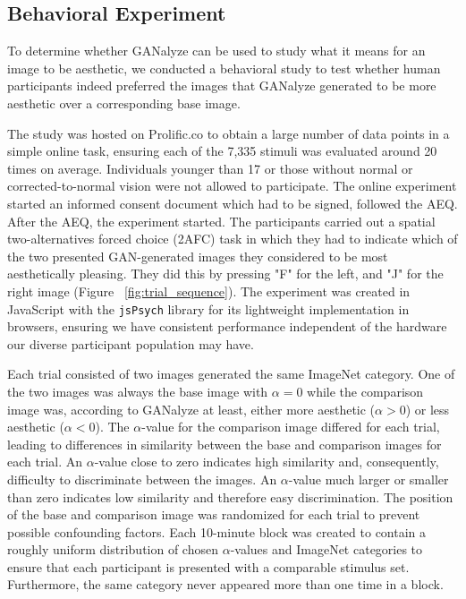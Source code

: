 \documentclass[../main.tex]{subfiles}
\begin{document}
	
	
	\subsection{Behavioral Experiment}
	To determine whether GANalyze can be used to study what it means for an image to be aesthetic, we conducted a behavioral study to test whether human participants indeed preferred the images that GANalyze generated to be more aesthetic over a corresponding base image.
	
	The study was hosted on Prolific.co to obtain a large number of data points in a simple online task, ensuring each of the 7,335 stimuli was evaluated around 20 times on average. Individuals younger than 17 or those without normal or corrected-to-normal vision were not allowed to participate. The online experiment started an informed consent document which had to be signed, followed the AEQ. After the AEQ, the experiment started.	The participants carried out a spatial two-alternatives forced choice (2AFC) task in which they had to indicate which of the two presented GAN-generated images they considered to be most aesthetically pleasing. They did this by pressing "F" for the left, and "J" for the right image (Figure ~\ref{fig:trial_sequence}). The experiment was created in JavaScript with the \texttt{jsPsych} library \parencite{de2015jspsych} for its lightweight implementation in browsers, ensuring we have consistent performance independent of the hardware our diverse participant population may have.
	
	Each trial consisted of two images generated the same ImageNet category. One of the two images was always the base image with $\alpha = 0$ while the comparison image was, according to GANalyze at least, either more aesthetic ($\alpha > 0$) or less aesthetic ($\alpha < 0$). The $\alpha$-value for the comparison image differed for each trial, leading to differences in similarity between the base and comparison images for each trial. An $\alpha$-value close to zero indicates high similarity and, consequently, difficulty to discriminate between the images. An $\alpha$-value much larger or smaller than zero indicates low similarity and therefore easy discrimination. The position of the base and comparison image was randomized for each trial to prevent possible confounding factors. Each 10-minute block was created to contain a roughly uniform distribution of chosen $\alpha$-values and ImageNet categories to ensure that each participant is presented with a comparable stimulus set. Furthermore, the same category never appeared more than one time in a block.
	
\end{document}

